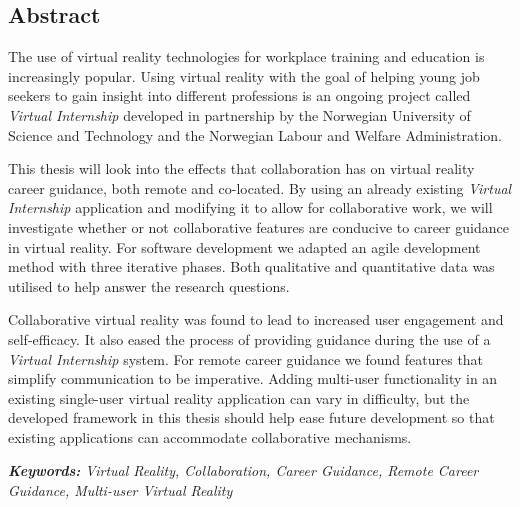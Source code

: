 \begin{center}
\vspace*{1mm}
\section*{\Huge Abstract}
\vspace*{0.7cm}
\end{center}



\noindent The use of virtual reality technologies for workplace training and education is increasingly popular. Using virtual reality with the goal of helping young job seekers to gain insight into different professions is an ongoing project called  \textit{Virtual Internship} developed in partnership by the Norwegian University of Science and Technology and the Norwegian Labour and Welfare Administration.

This thesis will look into the effects that collaboration has on virtual reality career guidance, both remote and co-located. By using an already existing \textit{Virtual Internship} application and modifying it to allow for collaborative work, we will investigate whether or not collaborative features are conducive to career guidance in virtual reality. For software development we adapted an agile development method with three iterative phases. Both qualitative and quantitative data  was utilised to help answer the research questions.   

Collaborative virtual reality was found to lead to increased user engagement and self-efficacy. It also eased the process of providing guidance during the use of a \textit{Virtual Internship} system. For remote career guidance we found features that simplify communication to be imperative.
Adding multi-user functionality in an existing single-user virtual reality application can vary in difficulty, but the developed framework in this thesis should help ease future development so that existing applications can accommodate collaborative mechanisms. 



\bigskip

\noindent \emph{\textbf{Keywords:} Virtual Reality, Collaboration, Career Guidance, Remote Career Guidance, Multi-user Virtual Reality}

\cleardoublepage
